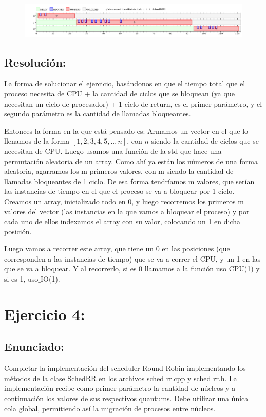 \documentclass[10pt, a4paper]{article}
\begin{document}
\begin{figure}[H]
  	\centering
   	\includegraphics[width=1\textwidth]
   	 {imgs/Batch.png}
	\caption{}
\end{figure}



\subsection{Resolución:}

La forma de solucionar el ejercicio, basándonos en que el tiempo total que el proceso necesita de CPU + la cantidad de ciclos que se bloquean (ya que necesitan un ciclo de procesador) + 1 ciclo de return, es el primer parámetro, y el segundo parámetro es la cantidad de llamadas bloqueantes.

 Entonces la forma en la que está pensado es: Armamos un vector en el que lo llenamos de la forma  $[1,2,3,4,5,..,n]$, con $n$ siendo la cantidad de ciclos que se necesitan de CPU. Luego usamos una función de la std que hace una permutación aleatoria de un array. Como ahí ya están los números de una forma aleatoria, agarramos los m primeros valores, con m siendo la cantidad de llamadas bloqueantes de 1 ciclo. 
De esa forma tendríamos m valores, que serían las instancias de tiempo en el que el proceso se va a bloquear por 1 ciclo. Creamos un array, inicializado  todo en 0, y luego recorremos los primeros m valores del vector (las instancias en la que vamos a bloquear el proceso) y  por cada uno de ellos indexamos el array con su valor, colocando  un 1 en dicha posición.

 Luego vamos a recorrer este array, que tiene un 0 en las posiciones (que corresponden a las instancias de tiempo) que se va a correr el CPU, y un 1 en las que se va a bloquear. Y al recorrerlo, si es 0 llamamos a la función uso$\_$CPU(1) y si es 1, uso$\_$IO(1).   

\section{Ejercicio 4:}
\subsection{Enunciado:}
Completar la implementación del scheduler Round-Robin implementando los
métodos de la clase SchedRR en los archivos sched rr.cpp y sched rr.h. La implementación
recibe como primer parámetro la cantidad de núcleos y a continuación los valores de sus
respectivos quantums. Debe utilizar una única cola global, permitiendo así la migración de procesos entre núcleos.
\end{document}
